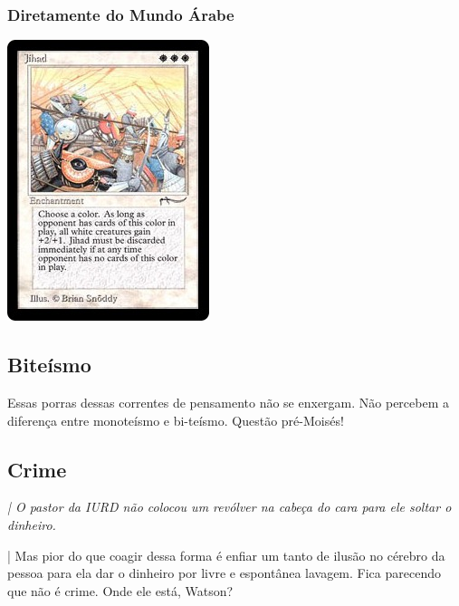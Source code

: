 \documentclass[12pt,a4paper]{article}
\begin{document}
		\subsubsection {Diretamente do Mundo \'Arabe}

			\begin{flushright}
			\end{flushright}

			\begin{center}
			\includegraphics{jihad}
			\end{center}

		\subsection{Bite\'ismo}
			\begin{flushright}
			\end{flushright}

		Essas porras dessas correntes de pensamento n\~ao se enxergam. N\~ao percebem a diferen\c{c}a entre monote\'ismo e bi-te\'ismo. Quest\~ao pr\'e-Mois\'es! %

		\subsection{Crime}
			\begin{flushright}
			\end{flushright}

			\emph{| O pastor da IURD\cite{x} n\~ao colocou um rev\'olver na cabe\c{c}a do cara para ele soltar o dinheiro.}

			| Mas pior do que coagir dessa forma \'e enfiar um tanto de ilus\~ao\cite{ilusao} no c\'erebro da pessoa para ela dar o dinheiro por livre e espont\^anea lavagem. Fica parecendo que n\~ao \'e crime. Onde ele est\'a, Watson?
\end{document}
